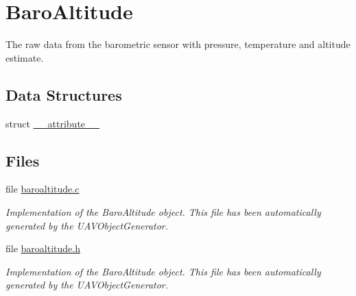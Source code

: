 \hypertarget{group___baro_altitude}{\section{\-Baro\-Altitude}
\label{group___baro_altitude}
}


\-The raw data from the barometric sensor with pressure, temperature and altitude estimate.  


\subsection*{\-Data \-Structures}
\begin{DoxyCompactItemize}
\item 
struct \hyperlink{struct____attribute____}{\-\_\-\-\_\-attribute\-\_\-\-\_\-}
\end{DoxyCompactItemize}
\subsection*{\-Files}
\begin{DoxyCompactItemize}
\item 
file \hyperlink{baroaltitude_8c}{baroaltitude.\-c}
\begin{DoxyCompactList}\small\item\em \-Implementation of the \-Baro\-Altitude object. \-This file has been automatically generated by the \-U\-A\-V\-Object\-Generator. \end{DoxyCompactList}\item 
file \hyperlink{baroaltitude_8h}{baroaltitude.\-h}
\begin{DoxyCompactList}\small\item\em \-Implementation of the \-Baro\-Altitude object. \-This file has been automatically generated by the \-U\-A\-V\-Object\-Generator. \end{DoxyCompactList}\end{DoxyCompactItemize}
